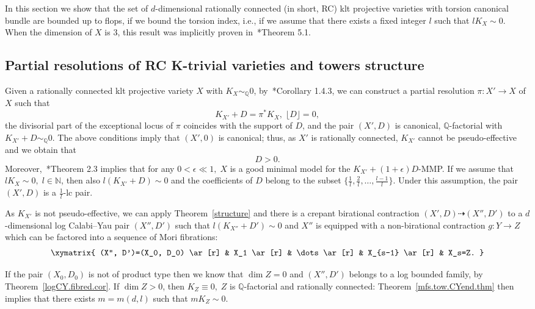 \documentclass[11pt]{ip-journal}
\theoremstyle{definition}
\begin{document}
In this section we show that the set of $d$-dimensional rationally connected (in short, RC) klt projective varieties with torsion canonical bundle are bounded up to flops, if we bound the torsion index, i.e., if we assume that there exists a fixed integer $l$ such that $lK_X\sim 0$.
When the dimension of $X$ is 3, this result was implicitly proven in~\cite{CDHJS}*{Theorem 5.1}.

\subsection{Partial resolutions of RC K-trivial varieties and towers structure}
\label{term.rc.cy.sect}
Given a rationally connected klt projective variety $X$ with $K_X \sim_\mathbb{Q}0$, by~\cite{BCHM}*{Corollary 1.4.3}, we can construct a partial resolution $\pi \colon X' \to X$ of $X$ such that
\[
K_{X'}+D = \pi^\ast K_X, \; \lfloor D \rfloor =0,
\]
the divisorial part of the exceptional locus of $\pi$ coincides with the support of $D$, and the pair $(X', D)$ is canonical, $\mathbb{Q}$-factorial with $K_{X'}+D \sim_{\mathbb{Q}} 0$. 
The above conditions imply that $(X', 0)$ is canonical; thus, as $X'$ is rationally connected, $K_{X'}$ cannot be pseudo-effective and we obtain that 
\[
D>0.
\] 
Moreover,~\cite{MR2802603}*{Theorem 2.3} implies that for any $0< \epsilon \ll 1, \; X$ is a good minimal model for the $K_{X'} +(1+\epsilon) D$-MMP.
If we assume that $lK_X \sim 0, \; l \in \mathbb{N}$, then also $l(K_{X'}+D) \sim 0$ and the coefficients of $D$ belong to the subset $\{\frac 1 l, \frac 2 l, \dots, \frac{l-1}{l}\}$.
Under this assumption, the pair $(X', D)$ is a $\frac 1 l$-lc pair.

As $K_{X'}$ is not pseudo-effective, we can apply Theorem~\ref{structure} and there is a crepant birational contraction $(X', D) \dashrightarrow (X'', D')$ to a $d$-dimensional log Calabi--Yau pair $(X'', D')$ such that $l(K_{X''} +D') \sim 0$ and $X''$ is equipped with a non-birational contraction $g \colon Y \to Z$ which can be factored into a sequence of Mori fibrations:
\begin{align}
\label{tower.term.eq}
\xymatrix{
 (X'', D')=(X_0, D_0) \ar[r] & X_1 \ar[r] & \dots \ar[r] & X_{s-1} \ar[r] & X_s=Z.
}
\end{align}

If the pair $(X_0, D_0)$ is not of product type then we know that $\dim Z=0$ and $(X'', D')$ belongs to a log bounded family, by Theorem~\ref{logCY.fibred.cor}.
If $\dim Z > 0$, then $K_Z \equiv 0, \; Z$ is $\mathbb{Q}$-factorial and rationally connected:
Theorem~\ref{mfs.tow.CYend.thm} then implies that there exists $m=m(d, l)$ such that $mK_Z \sim 0$.
\end{document}
